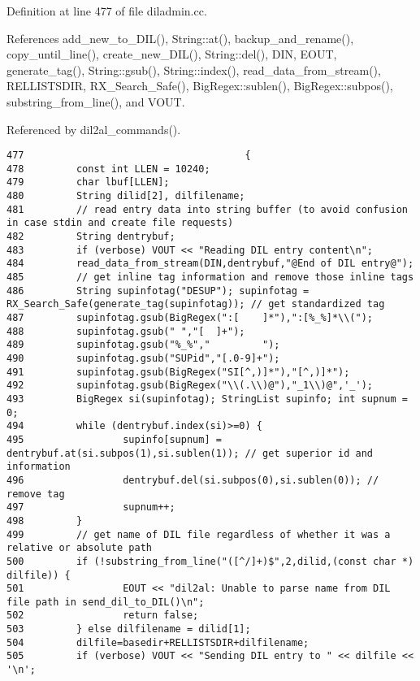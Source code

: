 Definition at line 477 of file diladmin.cc.

References add\_\-new\_\-to\_\-DIL(), String::at(), backup\_\-and\_\-rename(), copy\_\-until\_\-line(), create\_\-new\_\-DIL(), String::del(), DIN, EOUT, generate\_\-tag(), String::gsub(), String::index(), read\_\-data\_\-from\_\-stream(), RELLISTSDIR, RX\_\-Search\_\-Safe(), Big\-Regex::sublen(), Big\-Regex::subpos(), substring\_\-from\_\-line(), and VOUT.

Referenced by dil2al\_\-commands().



\footnotesize\begin{verbatim}477                                      {
478         const int LLEN = 10240;
479         char lbuf[LLEN];
480         String dilid[2], dilfilename;
481         // read entry data into string buffer (to avoid confusion in case stdin and create file requests)
482         String dentrybuf;
483         if (verbose) VOUT << "Reading DIL entry content\n";
484         read_data_from_stream(DIN,dentrybuf,"@End of DIL entry@");
485         // get inline tag information and remove those inline tags
486         String supinfotag("DESUP"); supinfotag = RX_Search_Safe(generate_tag(supinfotag)); // get standardized tag
487         supinfotag.gsub(BigRegex(":[    ]*"),":[%_%]*\\(");
488         supinfotag.gsub(" ","[  ]+");
489         supinfotag.gsub("%_%","         ");
490         supinfotag.gsub("SUPid","[.0-9]+");
491         supinfotag.gsub(BigRegex("SI[^,)]*"),"[^,)]*");
492         supinfotag.gsub(BigRegex("\\(.\\)@"),"_1\\)@",'_');
493         BigRegex si(supinfotag); StringList supinfo; int supnum = 0;
494         while (dentrybuf.index(si)>=0) {
495                 supinfo[supnum] = dentrybuf.at(si.subpos(1),si.sublen(1)); // get superior id and information
496                 dentrybuf.del(si.subpos(0),si.sublen(0)); // remove tag
497                 supnum++;
498         }
499         // get name of DIL file regardless of whether it was a relative or absolute path
500         if (!substring_from_line("([^/]+)$",2,dilid,(const char *) dilfile)) {
501                 EOUT << "dil2al: Unable to parse name from DIL file path in send_dil_to_DIL()\n";
502                 return false;
503         } else dilfilename = dilid[1];
504         dilfile=basedir+RELLISTSDIR+dilfilename;
505         if (verbose) VOUT << "Sending DIL entry to " << dilfile << '\n';

\end{verbatim}
